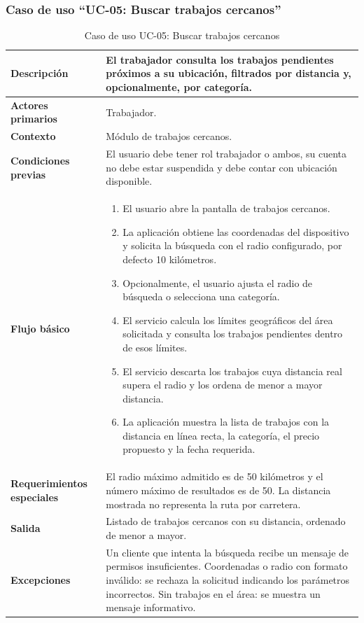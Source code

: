 \documentclass[doc,12pt,a4paper]{apa7}
\begin{document}
\subsubsection{Caso de uso ``UC-05: Buscar trabajos cercanos''}

\begin{longtable}{|P{3.3cm}|L{11.2cm}|}
\caption{Caso de uso UC-05: Buscar trabajos cercanos}\\
\hline
\textbf{Descripción} & El trabajador consulta los trabajos pendientes próximos a su ubicación, filtrados por distancia y, opcionalmente, por categoría. \\ \hline
\textbf{Actores primarios} & Trabajador. \\ \hline
\textbf{Contexto} & Módulo de trabajos cercanos. \\ \hline
\textbf{Condiciones previas} & El usuario debe tener rol trabajador o ambos, su cuenta no debe estar suspendida y debe contar con ubicación disponible. \\ \hline
\textbf{Flujo básico} &
\begin{enumerate}
    \item El usuario abre la pantalla de trabajos cercanos.
    \item La aplicación obtiene las coordenadas del dispositivo y solicita la búsqueda con el radio configurado, por defecto 10 kilómetros.
    \item Opcionalmente, el usuario ajusta el radio de búsqueda o selecciona una categoría.
    \item El servicio calcula los límites geográficos del área solicitada y consulta los trabajos pendientes dentro de esos límites.
    \item El servicio descarta los trabajos cuya distancia real supera el radio y los ordena de menor a mayor distancia.
    \item La aplicación muestra la lista de trabajos con la distancia en línea recta, la categoría, el precio propuesto y la fecha requerida.
\end{enumerate} \\ \hline
\textbf{Requerimientos especiales} & El radio máximo admitido es de 50 kilómetros y el número máximo de resultados es de 50. La distancia mostrada no representa la ruta por carretera. \\ \hline
\textbf{Salida} & Listado de trabajos cercanos con su distancia, ordenado de menor a mayor. \\ \hline
\textbf{Excepciones} & Un cliente que intenta la búsqueda recibe un mensaje de permisos insuficientes. Coordenadas o radio con formato inválido: se rechaza la solicitud indicando los parámetros incorrectos. Sin trabajos en el área: se muestra un mensaje informativo. \\ \hline
\end{longtable}
\end{document}

